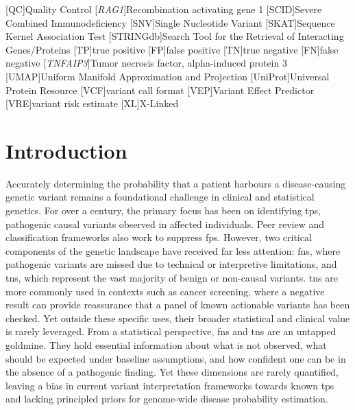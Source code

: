 \begin{acronym}
 [QC]{Quality Control}
 [\textit{RAG1}]{Recombination activating gene 1}
 [SCID]{Severe Combined Immunodeficiency}
 [SNV]{Single Nucleotide Variant}
 [SKAT]{Sequence Kernel Association Test}
 [STRINGdb]{Search Tool for the Retrieval of Interacting Genes/Proteins}
 [TP]{true positive}
[FP]{false positive}
[TN]{true negative}
[FN]{false negative}
[\textit{TNFAIP3}]{Tumor necrosis factor, alpha-induced protein 3}
 [UMAP]{Uniform Manifold Approximation and Projection}
 [UniProt]{Universal Protein Resource} 
 [VCF]{variant call format}
 [VEP]{Variant Effect Predictor}
 [VRE]{variant risk estimate}
 [XL]{X-Linked}
\end{acronym}

\section{Introduction}

Accurately determining the probability that a patient harbours a disease-causing genetic variant remains a foundational challenge in clinical and statistical genetics. For over a century, the primary focus has been on identifying \ac{tp}s, pathogenic causal variants observed in affected individuals. 
Peer review and classification frameworks also work to suppress \ac{fp}s.
However, two critical components of the genetic landscape have received far less attention: \ac{fn}s, where pathogenic variants are missed due to technical or interpretive limitations, and \ac{tn}s, which represent the vast majority of benign or non-causal variants. 
\ac{tn}s are more commonly used in contexts such as cancer screening, where a negative result can provide reassurance that a panel of known actionable variants has been checked. Yet outside these specific uses, their broader statistical and clinical value is rarely leveraged.
From a statistical perspective, \ac{fn}s and \ac{tn}s are an untapped goldmine. 
They hold essential information about what is not observed, what should be expected under baseline assumptions, and how confident one can be in the absence of a pathogenic finding. 
Yet these dimensions are rarely quantified, leaving a bias in current variant interpretation frameworks towards known \ac{tp}s and lacking principled priors for genome-wide disease probability estimation.

